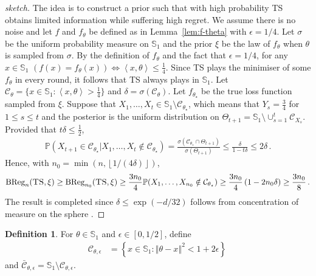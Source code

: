 \documentclass[letter, 12pt]{report}
\newcommand{\floor}[1]{\left\lfloor #1 \right\rfloor}
\newcommand{\ip}[1]{\left \langle #1 \right \rangle}
\newcommand{\BReg}{\textrm{BReg}}
\newcommand{\sphere}{\mathbb{S}}
\newcommand{\paren}[1]{\left( #1 \right)}
\newcommand{\norm}[1]{\left \Vert  #1 \right \Vert}
\newcommand{\cC}{\mathcal C}
\newcommand{\bS}{\mathbb S}
\newcommand{\bbP}{\mathbb P}
\newcommand{\1}{\mathbf{1}}
\newcommand{\ts}{\textsc{TS}\xspace}
\theoremstyle{plain}
\theoremstyle{definition}
\newtheorem{definition}[theorem]{Definition}
\theoremstyle{remark}
\begin{document}
\begin{proof}[sketch]
    The idea is to construct a prior such that with high probability \ts{} obtains limited information while suffering high regret.
    We assume there is no noise and let $f$ and $f_\theta$ be defined as in Lemma~\ref{lem:f-theta} with $\epsilon = 1/4$.
    Let $\sigma$ be the uniform probability measure on $\sphere_1$ and
    the prior $\xi$ be the law of $f_\theta$ when $\theta$ is sampled from $\sigma$.
    By the definition of $f_\theta$ and the fact that $\epsilon = 1/4$, for any $x \in \sphere_1$
    $\left(f(x) = f_\theta(x)\right) \Leftrightarrow \ip{x, \theta} \leq \frac{1}{4}$.
    Since \ts{} plays the minimiser of some $f_\theta$ in every round, it follows that \ts{} always plays in $\sphere_1$.
    Let $\cC_\theta = \{x \in \sphere_1 : \ip{x, \theta} > \frac{1}{4}\}$ and $\delta = \sigma(\cC_\theta)$.
    Let $f_{\theta_\star}$ be the true loss function sampled from $\xi$.
    Suppose that $X_1,\ldots,X_t \in \sphere_1 \setminus \cC_{\theta_\star}$,
    which means that $Y_s = \frac{3}{4}$ for $1 \leq s \leq t$ and
    the posterior is the uniform distribution on $\Theta_{t+1} = \sphere_1 \setminus \cup_{s=1}^t \cC_{X_s}$.
    Provided that $t \delta \leq \frac{1}{2}$,
    \begin{align*}
        \bbP(X_{t+1} \in \cC_{\theta_\star}|X_1,\ldots,X_t \notin \cC_{\theta_\star})
        = \frac{\sigma(\cC_{\theta_\star} \cap \Theta_{t+1})}{\sigma(\Theta_{t+1})}
        \leq \frac{\delta}{1 - t \delta}
        \leq 2\delta \,.
    \end{align*}
    Hence, with $n_0 = \min(n, \floor{1/(4\delta)})$,
    \begin{align*}
        \BReg_n(\ts, \xi)
        \geq \BReg_{n_0}(\ts, \xi) \geq
        \frac{3n_0}{4} \bbP(X_1,\ldots,X_{n_0} \notin \cC_{\theta_\star}) \geq \frac{3n_0}{4} \left(1 - 2n_0 \delta\right) \geq \frac{3n_0}{8} \,.
    \end{align*}
    The result is completed since $\delta \leq \exp(-d/32)$ follows from concentration of measure on the sphere \citep[Theorem B.1]{tkocz2018asymptotic}.
\end{proof}
\begin{definition}\label{def:C_theta}
    For \(\theta \in \bS_1\) and $\epsilon \in [0,1/2]$, define
    \begin{align*}
        \cC_{\theta, \epsilon}
         & = \left\{
        x \in \bS_1 : \norm{\theta-x}^2 < 1 + 2\epsilon
        \right\}
        \,
    \end{align*}
    and $\bar{\cC}_{\theta, \epsilon} = \bS_1 \setminus \cC_{\theta, \epsilon}$.
\end{definition}
\end{document}
